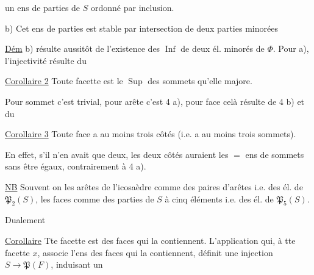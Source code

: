 
un ens de parties de $S$ ordonné par inclusion.

b)  Cet ens de parties est stable par intersection de deux parties minorées

\uline{Dém} b)  résulte aussitôt de l'existence des $\operatorname{Inf}$ de deux él. minorés de $\Phi$. Pour a), l'injectivité  résulte du

 \uline{Corollaire 2} Toute facette est le $\operatorname{Sup}$ des  sommets qu'elle majore.

Pour sommet c'est trivial, pour arête c'est 4 a), pour face celà résulte de 4 b) et du

\uline{Corollaire 3} Toute face a au moins trois côtés (i.e. a au moins trois sommets).

En effet, s'il n'en avait que deux, les deux côtés auraient les $=$ ens de sommets sans être égaux, contrairement à 4 a).

\uline{NB} Souvent on  les arêtes de l'icosaèdre comme des paires d'arêtes i.e. des él. de $\mathfrak P_2(S)$, les faces comme des parties de $S$ à cinq éléments i.e. des él. de $\mathfrak P_5(S)$.

Dualement

\uline{Corollaire} Tte facette est   des faces qui la contiennent. L'application qui, à tte facette $x$, associe l'ens des faces qui la contiennent, définit une injection $S\longrightarrow\mathfrak P(F)$, induisant un


